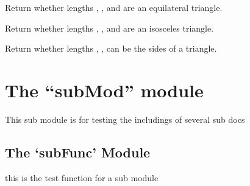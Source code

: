 \documentclass[letterpaper,10pt,english]{sphinxmanual}
\begin{document}

\begin{fulllineitems}
\label{\detokenize{api:trianglelib.utils.is_equilateral}}
Return whether lengths , , and  are an equilateral triangle.

\end{fulllineitems}


\begin{fulllineitems}
\label{\detokenize{api:trianglelib.utils.is_isosceles}}
Return whether lengths , , and  are an isosceles triangle.

\end{fulllineitems}


\begin{fulllineitems}
\label{\detokenize{api:trianglelib.utils.is_triangle}}
Return whether lengths , ,  can be the sides of a triangle.

\end{fulllineitems}



\chapter{The “subMod” module}
\label{\detokenize{subMod:the-submod-module}}\label{\detokenize{subMod::doc}}\label{\detokenize{subMod:module-trianglelib.subMod}}
This sub module is for testing the includings of several sub docs


\section{The ‘subFunc’ Module}
\label{\detokenize{subMod:module-trianglelib.subMod.subFunc}}\label{\detokenize{subMod:the-subfunc-module}}
this is the test function for a sub module
\end{document}
